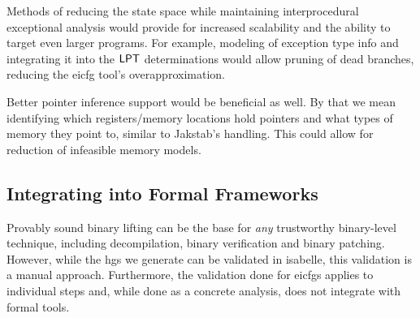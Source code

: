 Methods of reducing the state space while maintaining interprocedural exceptional analysis would provide for increased scalability and the ability to target even larger programs.
For example, modeling of exception type info and integrating it into the $\operatorname{\mathsf{LPT}}$ determinations would allow pruning of dead branches, reducing the \gls{eicfg} tool's overapproximation.

Better pointer inference support would be beneficial as well.
By that we mean identifying which registers/memory locations hold pointers and what types of memory they point to, similar to Jakstab's handling.
This could allow for reduction of infeasible memory models.


\subsection{Integrating  into Formal Frameworks}
Provably sound binary lifting can be the base for \emph{any} trustworthy binary-level technique, including decompilation, binary verification and binary patching.
However, while the \glspl{hg} we generate can be validated in \gls{isabelle}, this validation is a manual approach.
Furthermore, the validation done for \glspl{eicfg} applies to individual steps and, while done as a concrete analysis, does not integrate with formal tools.

